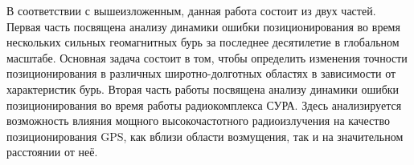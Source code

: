 В соответствии с вышеизложенным, данная работа состоит из двух частей.
Первая часть посвящена анализу динамики ошибки позиционирования во время нескольких сильных геомагнитных бурь за последнее десятилетие в глобальном масштабе.
Основная задача состоит в том, чтобы определить изменения точности позиционирования в различных широтно-долготных областях в зависимости от характеристик бурь.
Вторая часть работы посвящена анализу динамики ошибки позиционирования во время работы радиокомплекса СУРА.
Здесь анализируется возможность влияния мощного высокочастотного радиоизлучения на качество позиционирования GPS, как вблизи области возмущения, так и на значительном расстоянии от неё.